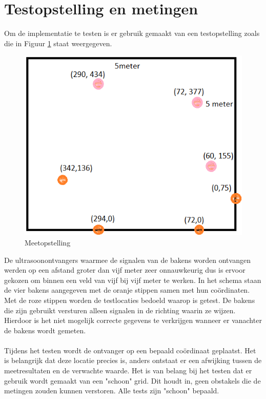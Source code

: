 \documentclass{article}
\begin{document}
\section{Testopstelling en metingen}
Om de implementatie te testen is er gebruik gemaakt van een testopstelling zoals die in Figuur \ref{Meetopstelling} staat weergegeven.
\begin{figure}[h] 
\centering\includegraphics[scale=0.5]{Meetopstelling.png}
\caption{Meetopstelling}
\label{Meetopstelling}
\end{figure}
De ultrasoonontvangers waarmee de signalen van de bakens worden ontvangen werden op een afstand groter dan vijf meter zeer onnauwkeurig dus is ervoor gekozen om binnen een veld van vijf bij vijf meter te werken. In het schema staan de vier bakens aangegeven met de oranje stippen samen met hun co\"{o}rdinaten. Met de roze stippen worden de testlocaties bedoeld waarop is getest. De bakens die zijn gebruikt versturen alleen signalen in de richting waarin ze wijzen. Hierdoor is het niet mogelijk correcte gegevens te verkrijgen wanneer er vanachter de bakens wordt gemeten. \\
\\
Tijdens het testen wordt de ontvanger op een bepaald co\"{o}rdinaat geplaatst. Het is belangrijk dat deze locatie precies is, anders ontstaat er een afwijking tussen de meetresultaten en de verwachte waarde. 
Het is van belang bij het testen dat er gebruik wordt gemaakt van een "schoon" grid. Dit houdt in, geen obstakels die de metingen zouden kunnen verstoren. Alle tests zijn "schoon"  bepaald. 
\end{document}
